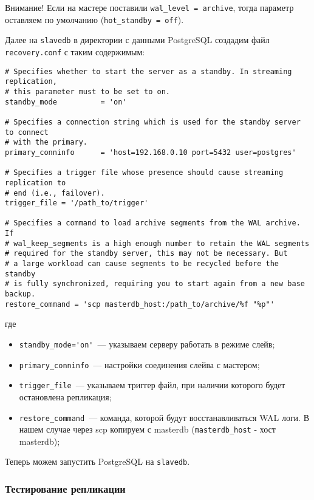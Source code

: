 Внимание! Если на мастере поставили \lstinline!wal_level = archive!, тогда параметр оставляем по умолчанию (\lstinline!hot_standby = off!).

Далее на \lstinline!slavedb! в директории с данными PostgreSQL создадим файл \lstinline!recovery.conf! с таким содержимым:

\begin{lstlisting}[label=lst:streaming14,caption=Конфиг recovery.conf]
# Specifies whether to start the server as a standby. In streaming replication,
# this parameter must to be set to on.
standby_mode          = 'on'

# Specifies a connection string which is used for the standby server to connect
# with the primary.
primary_conninfo      = 'host=192.168.0.10 port=5432 user=postgres'

# Specifies a trigger file whose presence should cause streaming replication to
# end (i.e., failover).
trigger_file = '/path_to/trigger'

# Specifies a command to load archive segments from the WAL archive. If
# wal_keep_segments is a high enough number to retain the WAL segments
# required for the standby server, this may not be necessary. But
# a large workload can cause segments to be recycled before the standby
# is fully synchronized, requiring you to start again from a new base backup.
restore_command = 'scp masterdb_host:/path_to/archive/%f "%p"'
\end{lstlisting}

где

\begin{itemize}
  \item \lstinline!standby_mode='on'!~--- указываем серверу работать в режиме слейв;
  \item \lstinline!primary_conninfo!~--- настройки соединения слейва с мастером;
  \item \lstinline!trigger_file!~--- указываем триггер файл, при наличии которого будет остановлена репликация;
  \item \lstinline!restore_command!~--- команда, которой будут восстанавливаться WAL логи. В нашем случае через scp копируем с masterdb (\lstinline!masterdb_host! - хост masterdb);
\end{itemize}

Теперь можем запустить PostgreSQL на \lstinline!slavedb!.

\subsubsection{Тестирование репликации}

